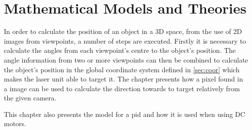 \chapter{Mathematical Models and Theories}
In order to calculate the position of an object in a 3D space, from the use of 2D images from viewpoints, a number of steps are executed. Firstly it is necessary to calculate the angles from each viewpoint's centre to the object's position. The angle information from two or more viewpoints can then be combined to calculate the object's position in the global coordinate system defined in \cref{sec:coor} which makes the laser unit able to target it. The chapter presents how a pixel found in a image can be used to calculate the direction towards to target relatively from the given camera.

This chapter also presents the model for a \acrlong{pid} and how it is used when using DC motors. 




